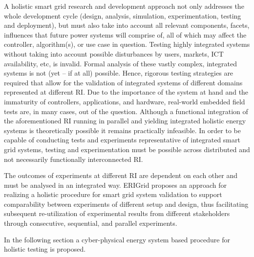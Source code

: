 A holistic smart grid research and development approach not only addresses the whole development cycle (design, analysis, simulation, experimentation, testing and deployment), but must also take into account all relevant components, facets, influences that future power systems will comprise of, all of which may affect the controller, algorithm(s), or use case in question.
Testing highly integrated systems without taking into account possible disturbances by users, markets, ICT availability, etc, is invalid. Formal analysis of these vastly complex, integrated systems is not (yet -- if at all) possible. Hence, rigorous testing strategies are required that allow for the validation of integrated systems of different domains represented at different RI. Due to the importance of the system at hand and the immaturity of controllers, applications, and hardware, real-world embedded field tests are, in many cases, out of the question.
Although a functional integration of the aforementioned RI running in parallel and yielding integrated holistic energy systems is theoretically possible it remains practically infeasible.
In order to be capable of conducting tests and experiments representative of integrated smart grid systems, testing and experimentation must be possible across distributed and not necessarily functionally interconnected RI.

The outcomes of experiments at different RI are dependent on each other and must be analysed in an integrated way. 
ERIGrid proposes an approach for realizing a %
holistic procedure for smart grid system validation to support comparability between experiments of different setup and design, 
thus facilitating subsequent re-utilization of experimental results from different stakeholders through consecutive, %
sequential, and parallel experiments. 

In the following section a cyber-physical energy system based procedure for holistic testing is proposed.